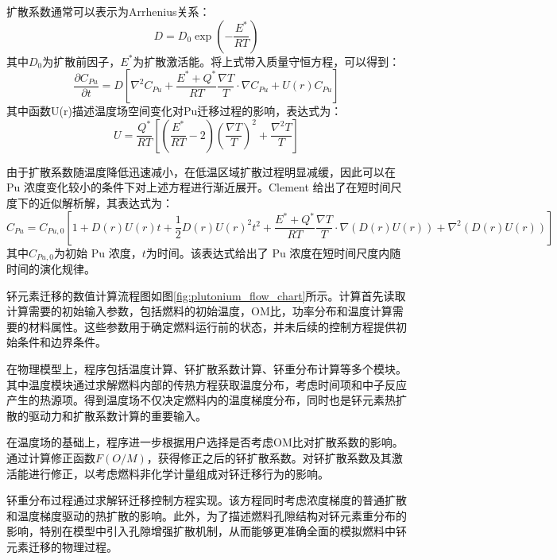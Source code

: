 扩散系数通常可以表示为Arrhenius关系：
\begin{equation}
	D = D_0 \exp\left(-\frac{E^{*}}{RT}\right)
\end{equation}
其中$D_0$为扩散前因子，$E^{*}$为扩散激活能。将上式带入质量守恒方程，可以得到：
\begin{equation}
	\frac{\partial C_{Pu}}{\partial t}
	=
	D
	\left[
	\nabla^{2}C_{Pu}
	+
	\frac{E^{*}+Q^{*}}{RT}
	\frac{\nabla T}{T}\cdot\nabla C_{Pu}
	+
	U(r)C_{Pu}
	\right]
\end{equation}
其中函数U(r)描述温度场空间变化对Pu迁移过程的影响，表达式为：
\begin{equation}
	U =
	\frac{Q^{*}}{RT}
	\left[
	\left(\frac{E^{*}}{RT}-2\right)\left(\frac{\nabla T}{T}\right)^2
	+
	\frac{\nabla^2T}{T}
	\right]
\end{equation}

由于扩散系数随温度降低迅速减小，在低温区域扩散过程明显减缓，因此可以在 Pu 浓度变化较小的条件下对上述方程进行渐近展开。Clement 给出了在短时间尺度下的近似解析解，其表达式为：
\begin{equation}
	C_{Pu} =
	C_{Pu,0}
	\left[
	1
	+
	D(r)U(r)t
	+
	\frac{1}{2}D(r)U(r)^2 t^2
	+
	\frac{E^{*}+Q^{*}}{RT}
	\frac{\nabla T}{T}
	\cdot
	\nabla(D(r)U(r))
	+
	\nabla^{2}(D(r)U(r))
	\right]
\end{equation}
其中$C_{Pu,0}$为初始 Pu 浓度，$t$为时间。该表达式给出了 Pu 浓度在短时间尺度内随时间的演化规律。

钚元素迁移的数值计算流程图如图\ref{fig:plutonium_flow_chart}所示。计算首先读取计算需要的初始输入参数，包括燃料的初始温度，O\/M比，功率分布和温度计算需要的材料属性。这些参数用于确定燃料运行前的状态，并未后续的控制方程提供初始条件和边界条件。

在物理模型上，程序包括温度计算、钚扩散系数计算、钚重分布计算等多个模块。其中温度模块通过求解燃料内部的传热方程获取温度分布，考虑时间项和中子反应产生的热源项。得到温度场不仅决定燃料内的温度梯度分布，同时也是钚元素热扩散的驱动力和扩散系数计算的重要输入。

在温度场的基础上，程序进一步根据用户选择是否考虑O\/M比对扩散系数的影响。通过计算修正函数$F(O/M)$，获得修正之后的钚扩散系数。对钚扩散系数及其激活能进行修正，以考虑燃料非化学计量组成对钚迁移行为的影响。

钚重分布过程通过求解钚迁移控制方程实现。该方程同时考虑浓度梯度的普通扩散和温度梯度驱动的热扩散的影响。此外，为了描述燃料孔隙结构对钚元素重分布的影响，特别在模型中引入孔隙增强扩散机制，从而能够更准确全面的模拟燃料中钚元素迁移的物理过程。

